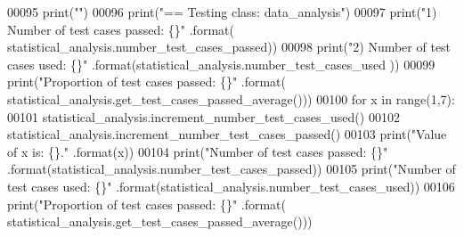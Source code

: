 \begin{DoxyCode}
00095         print(\textcolor{stringliteral}{""})
00096         print(\textcolor{stringliteral}{"==   Testing class: data\_analysis"})
00097         print(\textcolor{stringliteral}{"1) Number of test cases passed:      \{\}"} .format(
      statistical\_analysis.number\_test\_cases\_passed))
00098         print(\textcolor{stringliteral}{"2) Number of test cases used:        \{\}"} .format(statistical\_analysis.number\_test\_cases\_used
      ))
00099         print(\textcolor{stringliteral}{"Proportion of test cases passed: \{\}"} .format(
      statistical\_analysis.get\_test\_cases\_passed\_average()))
00100         \textcolor{keywordflow}{for} x \textcolor{keywordflow}{in} range(1,7):
00101             statistical\_analysis.increment\_number\_test\_cases\_used()
00102             statistical\_analysis.increment\_number\_test\_cases\_passed()
00103             print(\textcolor{stringliteral}{"Value of x is: \{\}."} .format(x))
00104             print(\textcolor{stringliteral}{"Number of test cases passed: \{\}"} .format(statistical\_analysis.number\_test\_cases\_passed))
00105             print(\textcolor{stringliteral}{"Number of test cases used:   \{\}"} .format(statistical\_analysis.number\_test\_cases\_used))
00106             print(\textcolor{stringliteral}{"Proportion of test cases passed: \{\}"} .format(
      statistical\_analysis.get\_test\_cases\_passed\_average()))
\end{DoxyCode}
